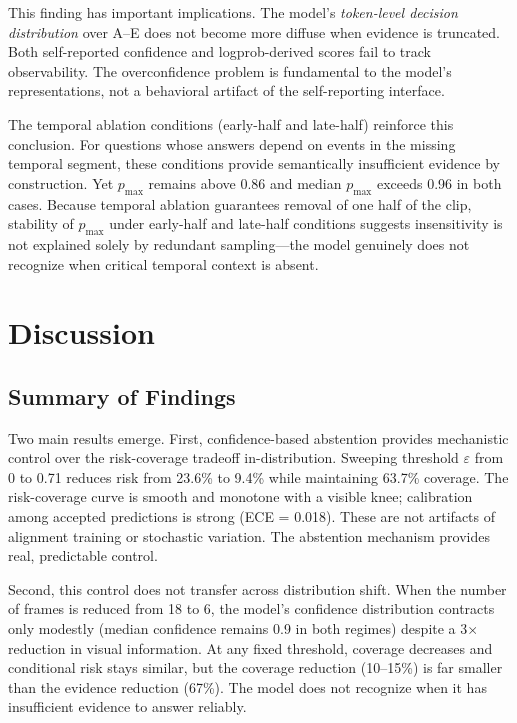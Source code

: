 \documentclass{article}
\begin{document}
This finding has important implications. The model's \emph{token-level decision distribution} over A--E does not become more diffuse when evidence is truncated. Both self-reported confidence and logprob-derived scores fail to track observability. The overconfidence problem is fundamental to the model's representations, not a behavioral artifact of the self-reporting interface.

The temporal ablation conditions (early-half and late-half) reinforce this conclusion. For questions whose answers depend on events in the missing temporal segment, these conditions provide semantically insufficient evidence by construction. Yet $p_{\max}$ remains above 0.86 and median $p_{\max}$ exceeds 0.96 in both cases. Because temporal ablation guarantees removal of one half of the clip, stability of $p_{\max}$ under early-half and late-half conditions suggests insensitivity is not explained solely by redundant sampling---the model genuinely does not recognize when critical temporal context is absent.

\section{Discussion}

\subsection{Summary of Findings}

Two main results emerge. First, confidence-based abstention provides mechanistic control over the risk-coverage tradeoff in-distribution. Sweeping threshold $\varepsilon$ from 0 to 0.71 reduces risk from 23.6\% to 9.4\% while maintaining 63.7\% coverage. The risk-coverage curve is smooth and monotone with a visible knee; calibration among accepted predictions is strong (ECE = 0.018). These are not artifacts of alignment training or stochastic variation. The abstention mechanism provides real, predictable control.

Second, this control does not transfer across distribution shift. When the number of frames is reduced from 18 to 6, the model's confidence distribution contracts only modestly (median confidence remains 0.9 in both regimes) despite a 3$\times$ reduction in visual information. At any fixed threshold, coverage decreases and conditional risk stays similar, but the coverage reduction (10--15\%) is far smaller than the evidence reduction (67\%). The model does not recognize when it has insufficient evidence to answer reliably.
\end{document}
